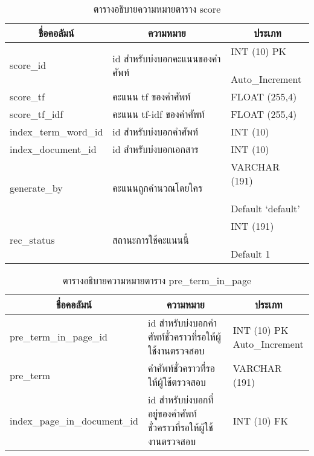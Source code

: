 \begin{table}[H]
\caption{ตารางอธิบายความหมายตาราง score}\label{tbl:score}        
\begin{tabular}{|l|l|l|}
\hline
\multicolumn{1}{|c|}{ชื่อคอลัมน์} & \multicolumn{1}{c|}{ความหมาย}                                      & \multicolumn{1}{c|}{ประเภท}                                                   \\ \hline
score\_id             & id   สำหรับบ่งบอกคะแนนของคำศัพท์ &\makecell[l]{INT   (10) PK\\    \\ Auto\_Increment}      \\ \hline
score\_tf             & คะแนน   tf ของคำศัพท์            & FLOAT   (255,4)                                                                     \\ \hline
score\_tf\_idf        & คะแนน   tf-idf ของคำศัพท์        & FLOAT   (255,4)                                                                     \\ \hline
index\_term\_word\_id & id   สำหรับบ่งบอกคำศัพท์         & INT   (10)                                                                          \\ \hline
index\_document\_id   & id สำหรับบ่งบอกเอกสาร            & INT   (10)                                                                          \\ \hline
generate\_by          & คะแนนถูกคำนวณโดยใคร              &\makecell[l]{VARCHAR   (191)\\    \\ Default   ‘default’}\\ \hline
rec\_status           & สถานะการใช้คะแนนนี้              &\makecell[l]{INT   (191)\\    \\ Default 1}              \\ \hline
\end{tabular}
\end{table}

\begin{table}[H]
\caption{ตารางอธิบายความหมายตาราง pre\_term\_in\_page}\label{tbl:preterminpage}        
\begin{tabular}{|l|l|l|}
\hline
\multicolumn{1}{|c|}{ชื่อคอลัมน์} & \multicolumn{1}{c|}{ความหมาย}                                      & \multicolumn{1}{c|}{ประเภท}                                                   \\ \hline
pre\_term\_in\_page\_id           & id   สำหรับบ่งบอกคำศัพท์ชั่วคราวที่รอให้ผู้ใช้งานตรวจสอบ           & \makecell[l]{INT   (10) PK\\Auto\_Increment} \\ \hline
pre\_term                         & คำศัพท์ชั่วคราวที่รอให้ผู้ใช้ตรวจสอบ                               & VARCHAR   (191)                                                               \\ \hline
index\_page\_in\_document\_id     & id   สำหรับบ่งบอกที่อยู่ของคำศัพท์ชั่วคราวที่รอให้ผู้ใช้งานตรวจสอบ & INT (10) FK                                                                   \\ \hline
\end{tabular}
\end{table}

